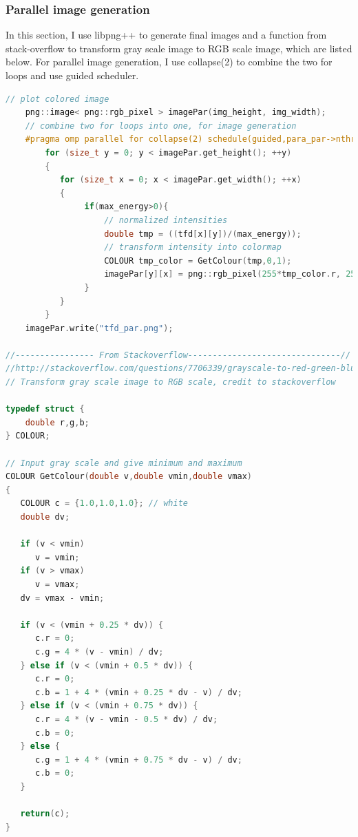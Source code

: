 \documentclass[11pt,letter]{article}
\begin{document}
\subsubsection{Parallel image generation}
In this section, I use libpng++ to generate final images and a function from stack-overflow to transform gray scale image to RGB scale image, which are listed below. For parallel image generation, I use collapse(2) to combine the two for loops and use guided scheduler.

\begin{lstlisting}[language=C++]
    // plot colored image
    png::image< png::rgb_pixel > imagePar(img_height, img_width);
    // combine two for loops into one, for image generation
    #pragma omp parallel for collapse(2) schedule(guided,para_par->nthread) num_threads(para_par->nthread) shared(imagePar)
        for (size_t y = 0; y < imagePar.get_height(); ++y)
        {
           for (size_t x = 0; x < imagePar.get_width(); ++x)
           {
                if(max_energy>0){
                    // normalized intensities
                    double tmp = ((tfd[x][y])/(max_energy));
                    // transform intensity into colormap
                    COLOUR tmp_color = GetColour(tmp,0,1);
                    imagePar[y][x] = png::rgb_pixel(255*tmp_color.r, 255*tmp_color.g, 255*tmp_color.b);
                }
           }
        }
    imagePar.write("tfd_par.png");
    
//---------------- From Stackoverflow-------------------------------//
//http://stackoverflow.com/questions/7706339/grayscale-to-red-green-blue-matlab-jet-color-scale
// Transform gray scale image to RGB scale, credit to stackoverflow

typedef struct {
    double r,g,b;
} COLOUR;

// Input gray scale and give minimum and maximum
COLOUR GetColour(double v,double vmin,double vmax)
{
   COLOUR c = {1.0,1.0,1.0}; // white
   double dv;

   if (v < vmin)
      v = vmin;
   if (v > vmax)
      v = vmax;
   dv = vmax - vmin;

   if (v < (vmin + 0.25 * dv)) {
      c.r = 0;
      c.g = 4 * (v - vmin) / dv;
   } else if (v < (vmin + 0.5 * dv)) {
      c.r = 0;
      c.b = 1 + 4 * (vmin + 0.25 * dv - v) / dv;
   } else if (v < (vmin + 0.75 * dv)) {
      c.r = 4 * (v - vmin - 0.5 * dv) / dv;
      c.b = 0;
   } else {
      c.g = 1 + 4 * (vmin + 0.75 * dv - v) / dv;
      c.b = 0;
   }

   return(c);
}
\end{lstlisting}
\end{document}
